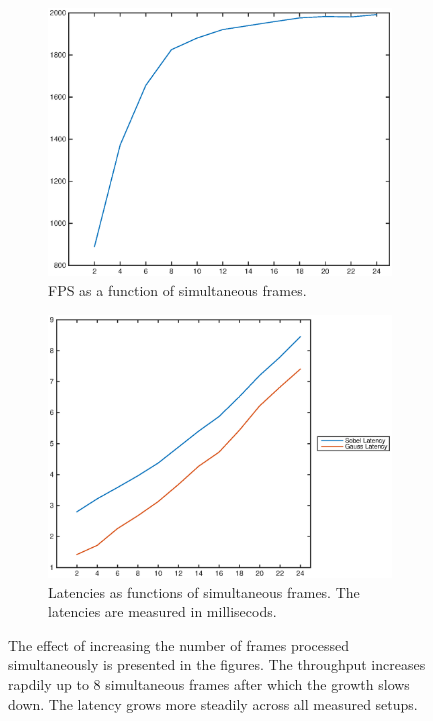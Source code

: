 \begin{figure}
    \centering
    \begin{subfigure}[t]{0.49\textwidth}
        \centering
        \includegraphics[width=0.99\linewidth]{images/simultaneous_frames_fps.eps}
        \caption{FPS as a function of simultaneous frames.}
        \label{fig:oeminitialframesfps}
    \end{subfigure}
    \begin{subfigure}[t]{0.49\textwidth}
        \centering
        \includegraphics[width=0.99\linewidth]{images/simultaneous_frames_latency.eps}
        \caption{Latencies as functions of simultaneous frames. The latencies
        are measured in millisecods.}
        \label{fig:oeminitialframeslat}
    \end{subfigure}
    \caption{The effect of increasing the number of frames processed
    simultaneously is presented in the figures. The throughput increases rapdily
    up to 8 simultaneous frames after which the growth slows down. The latency grows
    more steadily across all measured setups.}
\end{figure}

